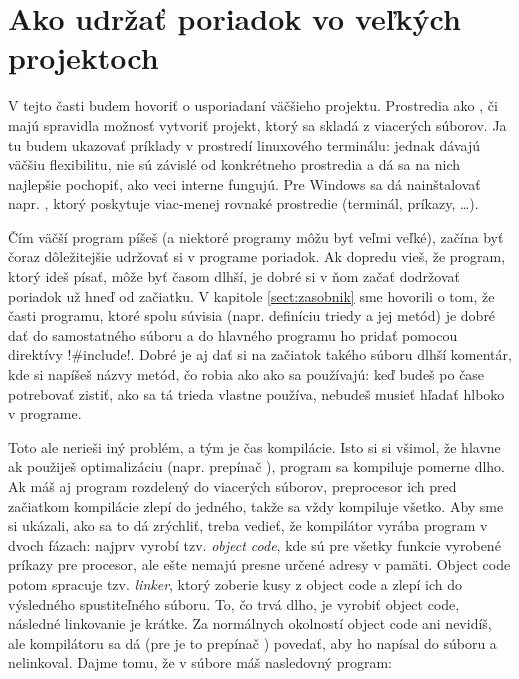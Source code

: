 \chapter{Ako udržať poriadok vo veľkých projektoch}
\label{sect:makefile}

V tejto časti budem hovoriť o usporiadaní väčšieho projektu.
Prostredia ako
, či 
majú spravidla možnosť vytvoriť projekt, ktorý sa skladá z viacerých súborov. 
Ja tu budem ukazovať príklady v prostredí linuxového terminálu: jednak dávajú väčšiu flexibilitu, nie sú závislé od konkrétneho 
prostredia a dá sa na nich najlepšie pochopiť, ako veci interne fungujú.
Pre Windows sa dá nainštalovať napr. , ktorý poskytuje
viac-menej rovnaké prostredie (terminál, príkazy, \ldots). 


Čím väčší program píšeš (a niektoré programy môžu byť veľmi veľké), 
začína byť čoraz dôležitejšie udržovať si v programe
poriadok. Ak dopredu vieš, že program, ktorý ideš písať, môže byť časom dlhší, je 
dobré si v ňom začať dodržovať poriadok už hneď od začiatku. V kapitole
\ref{sect:zasobnik} sme hovorili o tom, že časti programu, ktoré spolu súvisia (napr. 
definíciu triedy a jej metód) je dobré dať do samostatného súboru a do hlavného programu
ho pridať pomocou direktívy \prg!#include!. 
Dobré je aj dať si na začiatok takého súboru
dlhší komentár, kde si napíšeš názvy metód, čo robia ako ako sa používajú: keď budeš po čase potrebovať
zistiť, ako sa tá trieda vlastne používa, nebudeš musieť hľadať hlboko v programe.

Toto ale nerieši iný problém, a tým je čas kompilácie. 
Isto si si všimol, že hlavne ak použiješ optimalizáciu (napr. prepínač ), program sa
kompiluje pomerne dlho. Ak máš aj program rozdelený do viacerých súborov, preprocesor ich pred
začiatkom kompilácie zlepí do jedného, takže sa vždy kompiluje všetko. Aby sme si ukázali,
ako sa to dá zrýchliť, treba vedieť, že kompilátor vyrába program v dvoch fázach: najprv vyrobí
tzv. {\em object code}, kde sú pre všetky funkcie 
vyrobené príkazy pre procesor, ale ešte nemajú presne
určené adresy v pamäti. Object code potom spracuje tzv. {\em linker}, ktorý zoberie kusy z object code
a zlepí ich do výsledného spustiteľného súboru. To, čo trvá dlho, je vyrobiť object code, následné 
linkovanie je krátke. Za normálnych okolností object code ani nevidíš, ale kompilátoru sa dá
(pre  je to prepínač ) povedať, aby ho napísal do súboru a nelinkoval. 
Dajme tomu, že v súbore  máš nasledovný program:

